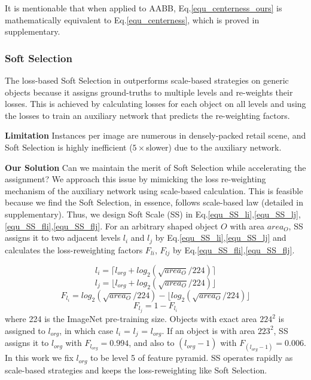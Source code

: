 \documentclass[runningheads]{llncs}
\begin{document}
It is mentionable that when applied to AABB, Eq.\ref{equ_centerness_ours} is mathematically equivalent to Eq.\ref{equ_centerness}, which is proved in supplementary.

\subsubsection{Soft Selection}
The loss-based Soft Selection in \cite{zhu2020soft} outperforms scale-based strategies on generic objects because it assigns ground-truths to multiple levels and re-weights their losses. This is achieved by calculating losses for each object on all levels and using the losses to train an auxiliary network that predicts the re-weighting factors. 

\textbf{Limitation} Instances per image are numerous in densely-packed retail scene, and Soft Selection is highly inefficient ($5\times$slower) due to the auxiliary network.

\textbf{Our Solution} Can we maintain the merit of Soft Selection while accelerating the assignment? We approach this issue by mimicking the loss re-weighting mechanism of the auxiliary network using scale-based calculation. This is feasible because we find the Soft Selection, in essence, follows scale-based law (detailed in supplementary). Thus, we design Soft Scale (SS) in Eq.\ref{equ_SS_li},\ref{equ_SS_lj},\ref{equ_SS_fli},\ref{equ_SS_flj}. For an arbitrary shaped object $O$ with area $area_O$, SS assigns it to two adjacent levels $l_i$ and $l_j$ by Eq.\ref{equ_SS_li},\ref{equ_SS_lj} and calculates the loss-reweighting factors $F_{li}$, $F_{lj}$ by Eq.\ref{equ_SS_fli},\ref{equ_SS_flj}.

\begin{equation} 
    l_i = \lceil l_{org} + log_2(\sqrt{area_O} / 224) \rceil
\label{equ_SS_li}
\end{equation}
\begin{equation}
    l_j = \lfloor l_{org} + log_2(\sqrt{area_O} / 224) \rfloor
\label{equ_SS_lj}
\end{equation}
\begin{equation}
   F_{l_i} = log_2(\sqrt{area_O} / 224) - \lfloor log_2(\sqrt{area_O} / 224) \rfloor
\label{equ_SS_fli}
\end{equation}
\begin{equation}
    F_{l_j} = 1 - F_{l_i}
\label{equ_SS_flj}
\end{equation}
where 224 is the ImageNet pre-training size.
Objects with exact area $224^2$ is assigned to $l_{org}$, in which case $l_i$ = $l_j$ = $l_{org}$. If an object is with area $223^2$, SS assigns it to $l_{org}$ with $F_{l_{org}} = 0.994$, and also to $(l_{org} - 1)$ with $F_{(l_{org}-1)} = 0.006$. In this work we fix $l_{org}$ to be level 5 of feature pyramid. SS operates rapidly as scale-based strategies and keeps the loss-reweighting like Soft Selection.
\end{document}
